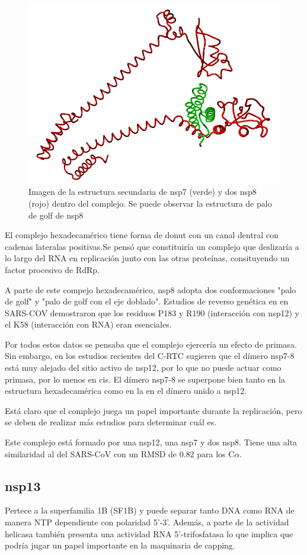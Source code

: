 \documentclass[a4paper,11pt]{report}
\begin{document}
\begin{figure}[h!]
	\centering
	\includegraphics[width=0.8\linewidth]{Figuras/Figura43}
	\caption{Imagen de la estructura secundaria de nsp7 (verde) y dos nsp8 (rojo) dentro del complejo. Se puede observar la estructura de palo de golf de nsp8}	
	\label{fig: nsp8}
\end{figure}

El complejo hexadecamérico tiene forma de donut con un canal dentral con cadenas lateralas positivas.Se pensó que constituiría un complejo que deslizaría a lo largo del RNA en replicación junto con las otras proteínas, consituyendo un factor procesivo de RdRp.

A parte de este compejo hexadecamérico, nsp8 adopta dos conformaciones "palo de golf" y "palo de golf con el eje doblado". Estudios de reverso genética en en SARS-COV demostraron que los residuos P183 y R190 (interacción con nsp12) y el K58 (interacción con RNA) eran esenciales.  \cite{biblia}

Por todos estos datos se pensaba que el complejo ejercería un efecto de primasa. Sin embargo, en los estudios recientes del C-RTC sugieren que el dímero nsp7-8 está muy alejado del sitio activo de nsp12, por lo que no puede actuar como primasa, por lo menos en cis. El dímero nsp7-8 se superpone bien tanto en la estructura hexadecamérica como en la en el dímero unido a nsp12.

Está claro que el complejo juega un papel importante durante la replicación, pero se deben de realizar más estudios para determinar cuál es.

Este complejo está formado por una nsp12, una nsp7 y dos nsp8. Tiene una alta similaridad al del SARS-CoV con un RMSD de 0.82 para los C$\alpha$. \cite{miniRTC}

\subsection{nsp13}
Pertece a la superfamilia 1B (SF1B) y puede separar tanto DNA como RNA de manera NTP dependiente con polaridad 5'-3'. Además, a parte de la actividad helicasa también presenta una actividad RNA 5'-trifosfatasa lo que implica que podría jugar un papel importante en la maquinaria de capping.
\cite{helicasa}
\end{document}
